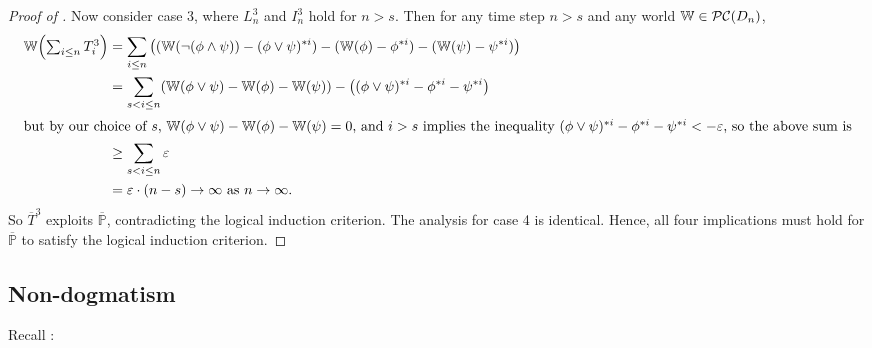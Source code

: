 \documentclass[authordate,onecolumn,noenvironments]{miri-tech-article}
\numberwithin{equation}{subsection}
\newcommand{\seq}[1]{{\overline{#1}}}
\newcommand{\nn}{n}
\newcommand{\lic}{logical induction criterion}
\newcommand{\trade}{T}%
\newcommand{\Trader}{\seq{\trade}} %
\newcommand{\strat}{T} %
\newcommand{\BelState}{\mathbb{P}}
\newcommand{\pt}{\BelState}
\newcommand{\MP}{\seq{\pt}}
\newcommand{\dt}{D}
\newcommand{\pcworlds}{\mathcal{P\-C}}
\newcommand{\World}{\mathbb{W}}
\begin{document}
\begin{proof}[Proof of ]
  Now consider case 3, where  $L^3_\nn$ and $I^3_\nn$ hold for $\nn>s$.
  Then for any time step $n>s$ and any world
  $\World\in\pcworlds(\dt_\nn)$,
  \begin{align*}
    \World\mleft({\textstyle \sum_{i \leq n} \strat^3_i}\mright) 
    &= \sum_{i \le \nn} \left((\World(\lnot(\phi \land \psi))-(\phi \lor \psi)^{* i}) - (\World(\phi)-\phi^{* i}) - (\World(\psi)-\psi^{* i}) \right) \\
    &= \sum_{s < i \le \nn} \mleft( \World(\phi \lor \psi) - \World(\phi) - \World(\psi) \mright) - \mleft((\phi \lor \psi)^{*i}  - \phi^{*i} - \psi^{*i} \mright) \\
    \intertext{but by our choice of $s$, $\World(\phi \lor \psi) - \World(\phi) - \World(\psi)=0$, and $i>s$ implies the inequality $(\phi \lor \psi)^{*i} - \phi^{*i} - \psi^{*i}< -\varepsilon$, so the above sum is}
    &\geq \sum_{s < i \le \nn} \varepsilon \\
    &= \varepsilon\cdot(\nn-s) \to\infty \text{ as }\nn\to\infty .
  \end{align*}
  So $\Trader^3$ exploits $\MP$, contradicting the \lic{}.  The analysis for case 4 is identical. Hence, all four implications must hold for $\MP$ to satisfy the \lic{}.
\end{proof}


\subsection{Non-dogmatism}
Recall :

\restatenondog*
\end{document}
